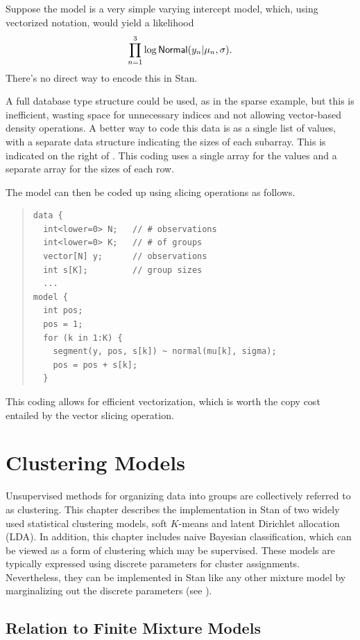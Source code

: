 Suppose the model is a very simple varying intercept model, which,
using vectorized notation, would yield a likelihood
\[
\prod_{n=1}^3 \log \distro{Normal}(y_n | \mu_n, \sigma).
\]
There's no direct way to encode this in Stan.  

A full database type structure could be used, as in the sparse
example, but this is inefficient, wasting space for unnecessary
indices and not allowing vector-based density operations.  A better
way to code this data is as a single list of values, with a separate
data structure indicating the sizes of each subarray.  This is
indicated on the right of .  This coding uses a
single array for the values and a separate array for the sizes of each
row.  

The model can then be coded up using slicing operations as follows.
\begin{quote}
\begin{Verbatim}
data {
  int<lower=0> N;   // # observations
  int<lower=0> K;   // # of groups
  vector[N] y;      // observations
  int s[K];         // group sizes
  ...
model {
  int pos;
  pos = 1;
  for (k in 1:K) {
    segment(y, pos, s[k]) ~ normal(mu[k], sigma);
    pos = pos + s[k];
  }
\end{Verbatim}
\end{quote}
%
This coding allows for efficient vectorization, which is worth the
copy cost entailed by the  vector slicing operation.


\chapter{Clustering Models}\label{clustering.chapter}

\noindent
Unsupervised methods for organizing data into groups are collectively
referred to as clustering.  This chapter describes the implementation
in Stan of two widely used statistical clustering models, soft
$K$-means and latent Dirichlet allocation (LDA).  In addition, this
chapter includes naive Bayesian classification, which can be viewed as
a form of clustering which may be supervised.  These models are
typically expressed using discrete parameters for cluster assignments.
Nevertheless, they can be implemented in Stan like any other mixture
model by marginalizing out the discrete parameters (see
).

\section{Relation to Finite Mixture Models}

